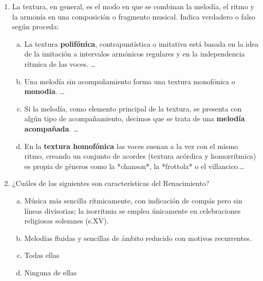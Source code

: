 \documentclass[letterpaper,12pt,notitlepage,spanish]{article}
\begin{document}
%
% 
\begin{ejercicio}[]
	\begin{enumerate}[1.-]
%
		\item 
		La textura, en general, es el modo en que se combinan la melodía, el ritmo y la armonía en una composición o fragmento musical. 
		Indica verdadero o falso según proceda:
		
		\begin{enumerate}[a)]
		\item La textura \textbf{polifónica}, contrapuntística o imitativa está basada  en la idea de la imitación a intervalos armónicos regulares y en la independencia rítmica de las voces. \ldots
		\item Una melodía sin acompañamiento forma una textura monofónica o \textbf{monodia}. \ldots
		\item Si la melodía, como elemento principal de la textura, se presenta con algún tipo de acompañamiento, decimos que se trata de una \textbf{melodía acompañada}. \ldots
		\item En la \textbf{textura homofónica} las voces suenan a la vez con el mismo ritmo, creando un conjunto de acordes (textura acórdica y homorrítmica) es propia de géneros como la *chanson*, la *frottola* o el villancico.\ldots
		\end{enumerate}
%
		\item 
		¿Cuáles de las siguientes son características del Renacimiento?
	    	\begin{enumerate}[a)]
	    	\item Música más sencilla rítmicamente, con indicación de compás pero sin líneas divisorias; la isorritmia se emplea únicamente en celebraciones religiosas solemnes (s.XV).
		    \item Melodías fluidas y sencillas de ámbito reducido con motivos recurrentes.
	    	\item Todas ellas 
	    	\item Ninguna de ellas
		    \end{enumerate}
	\end{enumerate}
\end{ejercicio}
%
%
\end{document}

